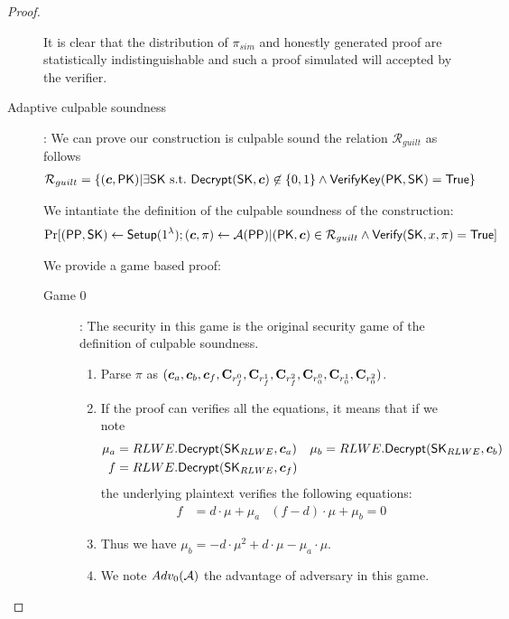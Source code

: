 \begin{proof}
\begin{description}
    It is clear that the distribution of $\pi_{sim}$ and honestly generated proof are statistically indistinguishable and such a proof simulated will accepted by the verifier.
    
  \item[\textsf{Adaptive culpable soundness}]:
    We can prove our construction is culpable sound \wrt the relation $\mathcal{R}_{guilt}$ as follows
    \begin{align*}
      \mathcal{R}_{guilt} &= \{(\vec{c}, \PK) | \exists \SK~\st~\Dec(\SK, \vec{c}) \not \in \{0,1\}  \wedge {\mathsf{VerifyKey}}(\PK, \SK)  = \True\}
    \end{align*}

    We intantiate the definition of the culpable soundness of the construction:
    \begin{align*}
      \Pr[(\PPP, \SK) \gets \Setup(1^{\lambda}); (\vec{c}, \pi) \gets \Adv(\PPP) | (\PK, \vec{c}) \in \mathcal{R}_{guilt} \wedge \Verif(\SK, x, \pi) = \True]
    \end{align*}

    We provide a game based proof:
    \begin{description}
    \item[\textsf{Game} $0$]: The security in this game is the original security game of the definition of culpable soundness.
      \begin{enumerate}
      \item Parse $\pi$ as $(\vec{c}_a, \vec{c}_b, \vec{c}_f, \mat{C}_{r_f^0}, \mat{C}_{r_f^1}, \mat{C}_{r_f^2}, \mat{C}_{r_0^0}, \mat{C}_{r_0^1}, \mat{C}_{r_0^2})$.
      \item If the proof can verifies all the equations, it means that if we note
        \begin{align*}
          \mu_a &= RLWE.\Dec(\SK_{RLWE}, \vec{c}_a) & \mu_b &= RLWE.\Dec(\SK_{RLWE}, \vec{c}_b) \\
          f &= RLWE.\Dec(\SK_{RLWE}, \vec{c}_f)
        \end{align*}
        the underlying plaintext verifies the following equations:
        \begin{align*}
          f &= d \cdot \mu + \mu_a & (f - d) \cdot \mu + \mu_b = 0
        \end{align*}
      \item Thus we have $\mu_b = - d \cdot \mu^2 + d \cdot \mu - \mu_a \cdot \mu$.
      \item We note $Adv_0(\mathcal{A})$ the advantage of adversary in this game.
      \end{enumerate}


\end{description}
\end{description}
\end{proof}
